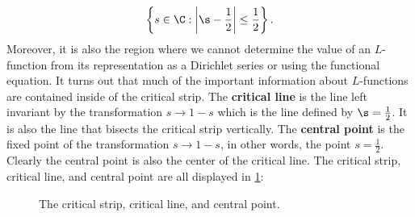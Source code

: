     \[
      \left\{s \in \C:\left|\s-\frac{1}{2}\right| \le \frac{1}{2}\right\}.
    \]
    Moreover, it is also the region where we cannot determine the value of an $L$-function from its representation as a Dirichlet series or using the functional equation. It turns out that much of the important information about $L$-functions are contained inside of the critical strip. The \textbf{critical line} is the line left invariant by the transformation $s \to 1-s$ which is the line defined by $\s = \frac{1}{2}$. It is also the line that bisects the critical strip vertically. The \textbf{central point} is the fixed point of the transformation $s \to 1-s$, in other words, the point $s = \frac{1}{2}$. Clearly the central point is also the center of the critical line. The critical strip, critical line, and central point are all displayed in \cref{fig:critical_strip}:

    \begin{figure}[ht]
      \centering
      \caption{The critical strip, critical line, and central point.}
      \label{fig:critical_strip}
    \end{figure}

